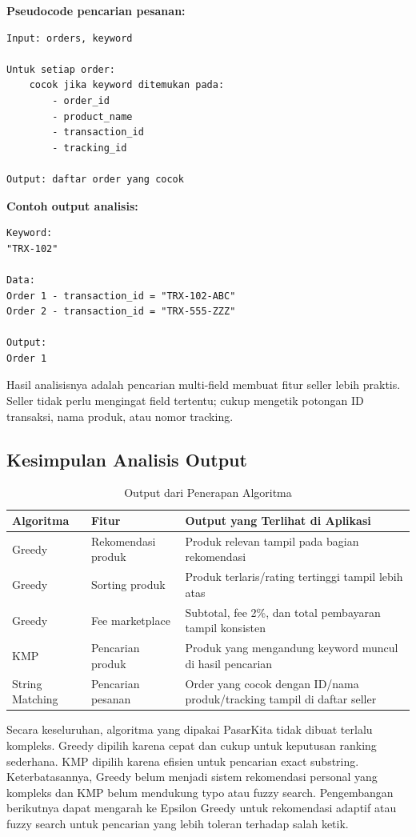 \textbf{Pseudocode pencarian pesanan:}

\begin{Verbatim}[frame=single,framesep=6pt,fontsize=\scriptsize]
Input: orders, keyword

Untuk setiap order:
    cocok jika keyword ditemukan pada:
        - order_id
        - product_name
        - transaction_id
        - tracking_id

Output: daftar order yang cocok
\end{Verbatim}

\textbf{Contoh output analisis:}

\begin{Verbatim}[frame=single,framesep=6pt,fontsize=\scriptsize]
Keyword:
"TRX-102"

Data:
Order 1 - transaction_id = "TRX-102-ABC"
Order 2 - transaction_id = "TRX-555-ZZZ"

Output:
Order 1
\end{Verbatim}

Hasil analisisnya adalah pencarian multi-field membuat fitur seller lebih praktis. Seller tidak perlu mengingat field tertentu; cukup mengetik potongan ID transaksi, nama produk, atau nomor tracking.

\subsection{Kesimpulan Analisis Output}

\begin{table}[htbp]
    \caption{Output dari Penerapan Algoritma}
    \label{tab:output-algoritma}
    \small
    \begin{tabularx}{\textwidth}{@{} >{\raggedright\arraybackslash}X >{\raggedright\arraybackslash}X >{\raggedright\arraybackslash}X @{}}
    \toprule
    \textbf{Algoritma} & \textbf{Fitur} & \textbf{Output yang Terlihat di Aplikasi} \\
    \midrule
    Greedy & Rekomendasi produk & Produk relevan tampil pada bagian rekomendasi \\
    Greedy & Sorting produk & Produk terlaris/rating tertinggi tampil lebih atas \\
    Greedy & Fee marketplace & Subtotal, fee 2\%, dan total pembayaran tampil konsisten \\
    KMP & Pencarian produk & Produk yang mengandung keyword muncul di hasil pencarian \\
    String Matching & Pencarian pesanan & Order yang cocok dengan ID/nama produk/tracking tampil di daftar seller \\
    \bottomrule
    \end{tabularx}
\end{table}

Secara keseluruhan, algoritma yang dipakai PasarKita tidak dibuat terlalu kompleks. Greedy dipilih karena cepat dan cukup untuk keputusan ranking sederhana. KMP dipilih karena efisien untuk pencarian exact substring. Keterbatasannya, Greedy belum menjadi sistem rekomendasi personal yang kompleks dan KMP belum mendukung typo atau fuzzy search. Pengembangan berikutnya dapat mengarah ke Epsilon Greedy untuk rekomendasi adaptif \parencite{Umami2021} atau fuzzy search untuk pencarian yang lebih toleran terhadap salah ketik.
